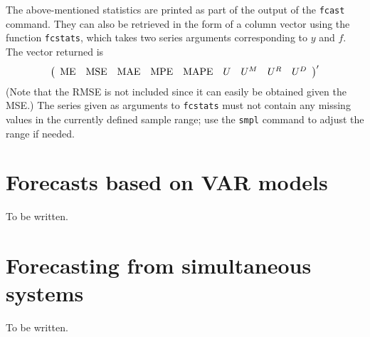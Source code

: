 The above-mentioned statistics are printed as part of the output of
the \texttt{fcast} command.  They can also be retrieved in the form of
a column vector using the function \texttt{fcstats}, which takes two
series arguments corresponding to $y$ and $f$.  The vector returned is
%
\[
\left(
\begin{array}{lllllllll}
{\rm ME} & {\rm MSE} & {\rm MAE} & {\rm MPE} & {\rm MAPE} &
U & U^M & U^R & U^D
\end{array}
\right)'
\]
%
(Note that the RMSE is not included since it can easily be obtained
given the MSE.)  The series given as arguments to \texttt{fcstats}
must not contain any missing values in the currently defined sample
range; use the \texttt{smpl} command to adjust the range if needed.

\section{Forecasts based on VAR models}
\label{sec:fcast-VAR}

To be written.

\section{Forecasting from simultaneous systems}
\label{sec:fcast-system}

To be written.

    
